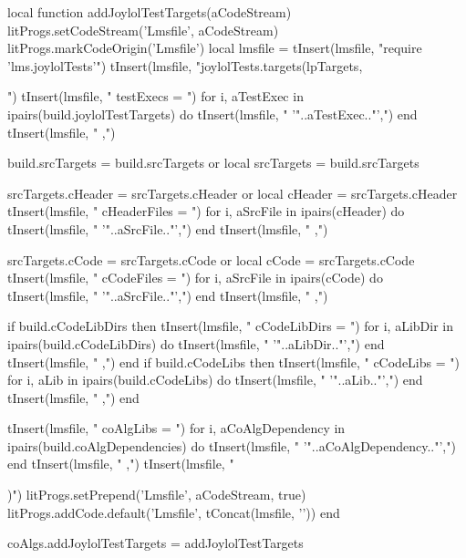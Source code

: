 \startLuaCode
local function addJoylolTestTargets(aCodeStream)
  litProgs.setCodeStream('Lmsfile', aCodeStream)
  litProgs.markCodeOrigin('Lmsfile')
  local lmsfile = {}
  tInsert(lmsfile, "require 'lms.joylolTests'\n")
  tInsert(lmsfile, "joylolTests.targets(lpTargets, {")
  tInsert(lmsfile, "  testExecs = {")
  for i, aTestExec in ipairs(build.joylolTestTargets) do
    tInsert(lmsfile, "    '"..aTestExec.."',")
  end
  tInsert(lmsfile, "  },")
  
  build.srcTargets = build.srcTargets or { }
  local srcTargets = build.srcTargets
  
  srcTargets.cHeader = srcTargets.cHeader or { }
  local cHeader      = srcTargets.cHeader
  tInsert(lmsfile, "  cHeaderFiles = {")
  for i, aSrcFile in ipairs(cHeader) do
    tInsert(lmsfile, "    '"..aSrcFile.."',")
  end
  tInsert(lmsfile, "  },")
  
  srcTargets.cCode = srcTargets.cCode or { }
  local cCode      = srcTargets.cCode
  tInsert(lmsfile, "  cCodeFiles = {")
  for i, aSrcFile in ipairs(cCode) do
    tInsert(lmsfile, "    '"..aSrcFile.."',")
  end
  tInsert(lmsfile, "  },")

  if build.cCodeLibDirs then 
    tInsert(lmsfile, "  cCodeLibDirs = {")
    for i, aLibDir in ipairs(build.cCodeLibDirs) do
      tInsert(lmsfile, "    '"..aLibDir.."',")
    end
    tInsert(lmsfile, "  },")
  end
  if build.cCodeLibs then 
    tInsert(lmsfile, "  cCodeLibs = {")
    for i, aLib in ipairs(build.cCodeLibs) do
      tInsert(lmsfile, "    '"..aLib.."',")
    end
    tInsert(lmsfile, "  },")
  end

  tInsert(lmsfile, "  coAlgLibs = {")
  for i, aCoAlgDependency in ipairs(build.coAlgDependencies) do
    tInsert(lmsfile, "    '"..aCoAlgDependency.."',")
  end
  tInsert(lmsfile, "  },")
  tInsert(lmsfile, "})")
  litProgs.setPrepend('Lmsfile', aCodeStream, true)
  litProgs.addCode.default('Lmsfile', tConcat(lmsfile, '\n'))
end

coAlgs.addJoylolTestTargets = addJoylolTestTargets
\stopLuaCode
